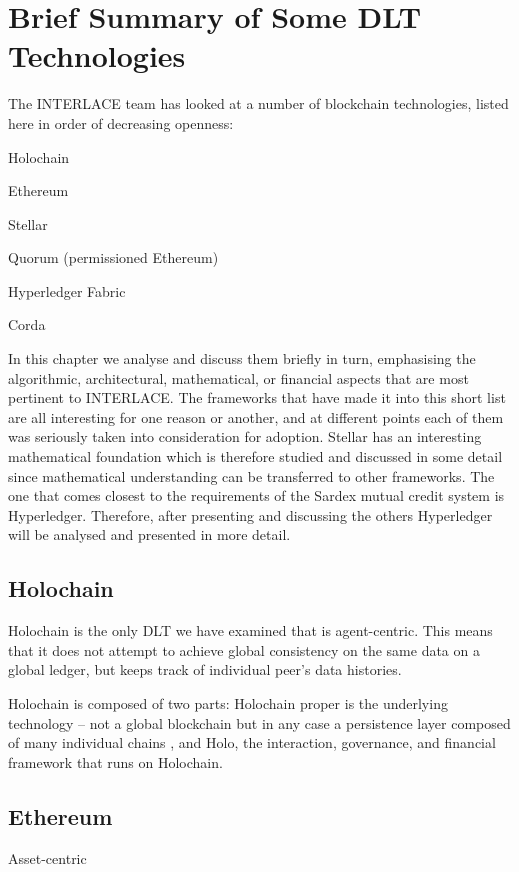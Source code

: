 \section{Brief Summary of Some DLT Technologies}

The INTERLACE team has looked at a number of blockchain technologies, listed here in order of decreasing openness:
\begin{packed_item1}
\item Holochain
\item Ethereum
\item Stellar
\item Quorum (permissioned Ethereum)
\item Hyperledger Fabric
\item Corda
\end{packed_item1}
In this chapter we analyse and discuss them briefly in turn, emphasising the algorithmic, architectural,  mathematical, or financial aspects that are most pertinent to INTERLACE. The frameworks that have made it into this short list are all interesting for one reason or another, and at different points each of them was seriously taken into consideration for adoption. Stellar has an interesting mathematical foundation which is therefore studied and discussed in some detail since mathematical understanding can be transferred to other frameworks. The one that comes closest to the requirements of the Sardex mutual credit system is Hyperledger. Therefore, after presenting and discussing the others Hyperledger will be analysed and presented in more detail.


\subsection{Holochain}
Holochain is the only DLT we have examined that is agent-centric. This means that it does not attempt to achieve global consistency on the same data on a global ledger, but keeps track of individual peer's data histories.

Holochain is composed of two parts: Holochain proper is the underlying technology -- not a global blockchain but in any case a persistence layer composed of many individual chains \cite{HarrisBrownEtAl2018}, and Holo, the interaction, governance, and financial framework that runs on Holochain.


\subsection{Ethereum}
Asset-centric


